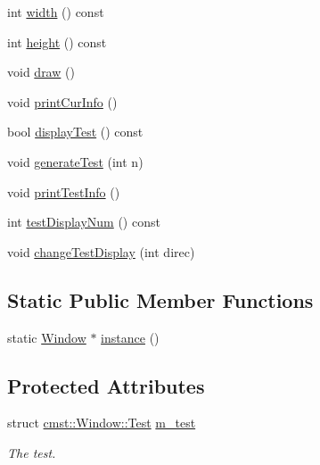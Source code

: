 \begin{DoxyCompactItemize}
int \hyperlink{classcmst_1_1_window_a5fc4ccbd9afed56cd17d341269028da2}{width} () const 
\item 
int \hyperlink{classcmst_1_1_window_a6fc02b2afee52c0f71b6a3bd39c9210f}{height} () const 
\item 
void \hyperlink{classcmst_1_1_window_a1d78ef796691e87ed3b4978f373c9890}{draw} ()
\item 
void \hyperlink{classcmst_1_1_window_a73eb23d7d7418cb288022e623e590461}{printCurInfo} ()
\item 
bool \hyperlink{classcmst_1_1_window_aa3f5edeebdd298190bdb4676b4838f75}{displayTest} () const 
\item 
void \hyperlink{classcmst_1_1_window_acda99115d9c67f83de4d8f5a94f2647c}{generateTest} (int n)
\item 
void \hyperlink{classcmst_1_1_window_a471e1648f99754f7c2cbfbbb1e8ab556}{printTestInfo} ()
\item 
int \hyperlink{classcmst_1_1_window_ae456c1bf45fc28133390fcc881fbd612}{testDisplayNum} () const 
\item 
void \hyperlink{classcmst_1_1_window_aa8dc3725888e12fc2c6e3626ab7b600a}{changeTestDisplay} (int direc)
\end{DoxyCompactItemize}
\subsection*{Static Public Member Functions}
\begin{DoxyCompactItemize}
\item 
static \hyperlink{classcmst_1_1_window}{Window} $\ast$ \hyperlink{classcmst_1_1_window_a281790e82296e7be50c19520f136e345}{instance} ()
\end{DoxyCompactItemize}
\subsection*{Protected Attributes}
\begin{DoxyCompactItemize}
\item 
struct \hyperlink{structcmst_1_1_window_1_1_test}{cmst::Window::Test} \hyperlink{classcmst_1_1_window_aedae466fb2efd886cea6d775b20fabe3}{m\_test}
\begin{DoxyCompactList}\small\item\em The test. \end{DoxyCompactList}\end{DoxyCompactItemize}
